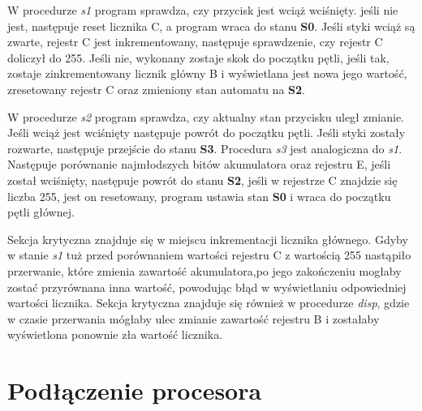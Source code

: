 \documentclass[fleqn]{article}
\begin{document}
W procedurze \textit{s1} program sprawdza, czy przycisk jest wciąż wciśnięty. jeśli nie jest, następuje reset licznika C, a program wraca do stanu \textbf{S0}. Jeśli styki wciąż są zwarte, rejestr C jest inkrementowany, następuje sprawdzenie, czy rejestr C doliczył do 255. Jeśli nie, wykonany zostaje skok do początku pętli, jeśli tak, zostaje zinkrementowany licznik główny B i wyświetlana jest nowa jego wartość, zresetowany rejestr C oraz zmieniony stan automatu na \textbf{S2}.

W procedurze \textit{s2} program sprawdza, czy aktualny stan przycisku uległ zmianie. Jeśli wciąż jest wciśnięty następuje powrót do początku pętli. Jeśli styki zostały rozwarte, następuje przejście do stanu \textbf{S3}. Procedura \textit{s3} jest analogiczna do \textit{s1}. Następuje porównanie najmłodszych bitów akumulatora oraz rejestru E, jeśli został wciśnięty, następuje powrót do stanu \textbf{S2}, jeśli w rejestrze C znajdzie się liczba 255, jest on resetowany, program ustawia stan \textbf{S0} i wraca do początku pętli głównej.

Sekcja krytyczna znajduje się w miejscu inkrementacji licznika głównego. Gdyby w stanie \textit{s1} tuż przed porównaniem wartości rejestru C z wartością 255 nastąpiło przerwanie, które zmienia zawartość akumulatora,po jego zakończeniu mogłaby zostać przyrównana inna wartość, powodując błąd w wyświetlaniu odpowiedniej wartości licznika. Sekcja krytyczna znajduje się również w procedurze \textit{disp}, gdzie w czasie przerwania mógłaby ulec zmianie zawartość rejestru B i zostałaby wyświetlona ponownie zła wartość licznika.

\pagebreak

\noindent\begin{minipage}{.45\textwidth}
	
\end{minipage}\hfill
\noindent\begin{minipage}{.45\textwidth}
	
\end{minipage}\hfill

\pagebreak

\section{Podłączenie procesora}
\end{document}
